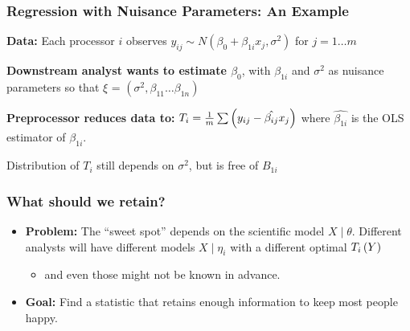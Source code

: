 \documentclass[10pt, compress]{beamer}
\begin{document}
\begin{frame}[fragile]

    \frametitle{Regression with Nuisance Parameters: An Example}
    
    \vspace*{5mm}
    
    \textbf{Data:} Each processor $i$ observes $y_{ij} \sim N(\beta_0 + \beta_{1i}x_j, \sigma^2)$ for $j = 1 \ldots m$
    
    \vspace*{2mm}

    \textbf{Downstream analyst wants to estimate $\beta_0$}, with $\beta_{1i}$ and $\sigma^2$ as nuisance parameters so that $\xi$ = $(\sigma^2, \beta_{11} \ldots \beta_{1n})$
    
    \vspace*{2mm}

    \textbf{Preprocessor reduces data to:} $T_i = \frac{1}{m}\sum\del{y_{ij} - \hat{\beta_{ij}}x_j}$ where $\hat{\beta_{1i}}$ is the OLS estimator of $\beta_{1i}$.
    
    \vspace*{5mm}
    
    Distribution of $T_i$ still depends on $\sigma^2$, but is free of $B_{1i}$ 
\end{frame}

\begin{frame}[fragile]
    \frametitle{What should we retain?}
    \begin{itemize}
        \item \textbf{Problem:} The “sweet spot” depends on the scientific model $X \mid \theta$. Different analysts will have different models $X \mid \eta_i$ with a different optimal $T_i\del{Y}$
            \begin{itemize}
                \item and even those might not be known in advance.
            \end{itemize}
        \item \textbf{Goal:} Find a statistic that retains enough information to keep most people happy.
    \end{itemize}
\end{frame}
\end{document}
